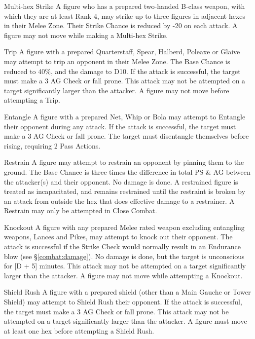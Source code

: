 \begin{multicols*}{3}
\begin{Description}
\item[Multi-hex Strike] A figure who has a prepared two-handed B-class
weapon, with which they are at least Rank 4, may strike up to three
figures in adjacent hexes in their Melee Zone. Their Strike Chance is
reduced by -20 on each attack. A figure may not move while making a
Multi-hex Strike.

\item[Trip] A figure with a prepared Quarterstaff, Spear, Halberd,
Poleaxe or Glaive may attempt to trip an opponent in their Melee
Zone. The Base Chance is reduced to 40\%, and the damage to D10. If
the attack is successful, the target must make a 3 \x AG Check or fall
prone. This attack may not be attempted on a target significantly
larger than the attacker. A figure may not move before attempting a
Trip.

\item[Entangle] A figure with a prepared Net, Whip or Bola may attempt
to Entangle their opponent during any attack. If the attack is
successful, the target must make a 3 \x AG Check or fall prone. The
target must disentangle themselves before rising, requiring 2 Pass
Actions.

\item[Restrain] A figure may attempt to restrain an opponent by
pinning them to the ground. The Base Chance is three times the
difference in total PS \& AG between the attacker(s) and their
opponent. No damage is done. A restrained figure is treated as
incapacitated, and remains restrained until the restraint is broken by
an attack from outside the hex that does effective damage to a
restrainer. A Restrain may only be attempted in Close Combat.

\item[Knockout] A figure with any prepared Melee rated weapon
excluding entangling weapons, Lances and Pikes, may attempt to knock
out their opponent. The attack is successful if the Strike Check would
normally result in an Endurance blow (see \S \ref{combat:damage}). No
damage is done, but the target is unconscious for [D + 5] minutes.
This attack may not be attempted on a target significantly larger than
the attacker. A figure may not move while attempting a Knockout.

\item[Shield Rush] A figure with a prepared shield (other than a Main
Gauche or Tower Shield) may attempt to Shield Rush their opponent. If
the attack is successful, the target must make a 3 \x AG Check or fall
prone. This attack may not be attempted on a target significantly
larger than the attacker. A figure must move at least one hex before
attempting a Shield Rush.


\end{Description}
\end{multicols*}
